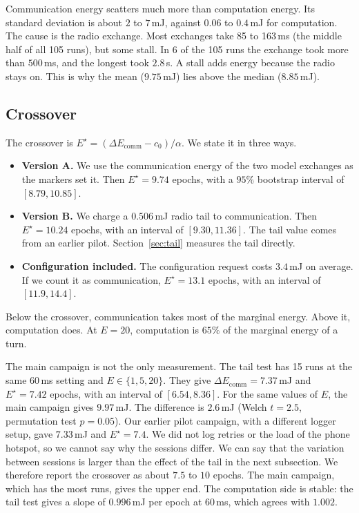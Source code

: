 \documentclass[journal]{IEEEtran}
\newcommand{\Estar}{E^{\star}}
\begin{document}
Communication energy scatters much more than computation energy. Its standard deviation is about $2$ to $7$\,mJ, against $0.06$ to $0.4$\,mJ for computation. The cause is the radio exchange. Most exchanges take 85 to 163\,ms (the middle half of all 105 runs), but some stall. In 6 of the 105 runs the exchange took more than $500$\,ms, and the longest took $2.8$\,s. A stall adds energy because the radio stays on. This is why the mean ($9.75$\,mJ) lies above the median ($8.85$\,mJ).

\subsection{Crossover}
\label{sec:crossover}
The crossover is $\Estar=(\Delta E_{\mathrm{comm}}-c_0)/\alpha$. We state it in three ways.
\begin{itemize}
\item \textbf{Version A.} We use the communication energy of the two model exchanges as the markers set it. Then $\Estar=9.74$ epochs, with a $95\%$ bootstrap interval of $[8.79,10.85]$.
\item \textbf{Version B.} We charge a $0.506$\,mJ radio tail to communication. Then $\Estar=10.24$ epochs, with an interval of $[9.30,11.36]$. The tail value comes from an earlier pilot. Section~\ref{sec:tail} measures the tail directly.
\item \textbf{Configuration included.} The configuration request costs $3.4$\,mJ on average. If we count it as communication, $\Estar=13.1$ epochs, with an interval of $[11.9,14.4]$.
\end{itemize}
Below the crossover, communication takes most of the marginal energy. Above it, computation does. At $E=20$, computation is $65\%$ of the marginal energy of a turn.

The main campaign is not the only measurement. The tail test has 15 runs at the same $60$\,ms setting and $E\in\{1,5,20\}$. They give $\Delta E_{\mathrm{comm}}=7.37$\,mJ and $\Estar=7.42$ epochs, with an interval of $[6.54,8.36]$. For the same values of $E$, the main campaign gives $9.97$\,mJ. The difference is $2.6$\,mJ (Welch $t=2.5$, permutation test $p=0.05$). Our earlier pilot campaign, with a different logger setup, gave $7.33$\,mJ and $\Estar=7.4$. We did not log retries or the load of the phone hotspot, so we cannot say why the sessions differ. We can say that the variation between sessions is larger than the effect of the tail in the next subsection. We therefore report the crossover as about $7.5$ to $10$ epochs. The main campaign, which has the most runs, gives the upper end. The computation side is stable: the tail test gives a slope of $0.996$\,mJ per epoch at $60$\,ms, which agrees with $1.002$.
\end{document}
